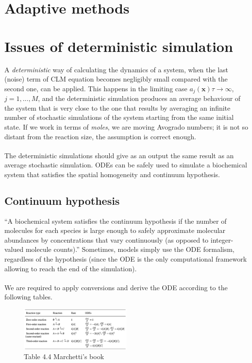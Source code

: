 \section{Adaptive methods}

\section{Issues of deterministic simulation}





A \emph{deterministic} way of calculating the dynamics of a system, when the last (noise) term of CLM equation becomes negligibly small compared with the second one, can be applied.
This happens in the limiting case $a_j(\mathbf{x})\tau → \infty$, $j = 1,...,M$, and the deterministic simulation produces an average behaviour of the system that is very close to the one that results by averaging an infinite number of stochastic simulations of the system starting from the same initial state.
If we work in terms of \emph{moles}, we are moving Avogrado numbers; it is not so distant from the reaction size, the assumption is correct enough.
\\
\\
\noindent
The deterministic simulations should give as an output the same result as an average stochastic simulation.
ODEs can be safely used to simulate a biochemical system that satisfies the spatial homogeneity and continuum hypothesis.
  \subsection{Continuum hypothesis}
  ``A biochemical system satisfies the continuum hypothesis if the number of molecules for each species is large enough to safely approximate molecular abundances by concentrations that vary continuously (as opposed to integer- valued molecule counts).''
  Sometimes, models simply use the ODE formalism, regardless of the hypothesis (since the ODE is the only computational framework allowing to reach the end of the simulation).
  \\
  \\
  \noindent
  We are required to apply conversions and derive the ODE according to the following tables.

  \begin{figure}
    \centering
    \includegraphics[width=0.5\textwidth]{reaction_ODEs.png}
    \caption{Table 4.4 Marchetti's book}
    \label{fig:rec_ODE}
  \end{figure}

